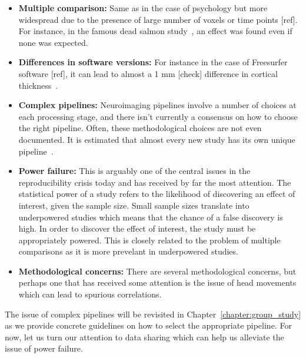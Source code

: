\begin{itemize}[noitemsep,partopsep=0pt]
\item \textbf{Multiple comparison:} Same as in the case of psychology but more widespread due to the presence of large number of voxels or time points [ref]. For instance, in the famous dead salmon study~\citep{bennett2009neural}, an effect was found even if none was expected.
\item \textbf{Differences in software versions:} For instance in the case of Freesurfer software [ref], it can lead to almost a 1 mm [check] difference in cortical thickness~\citep{gronenschild2012effects}.
\item \textbf{Complex pipelines:} Neuroimaging pipelines involve a number of choices at each processing stage, and there isn't currently a consensus on how to choose the right pipeline. Often, these methodological choices are not even documented. It is estimated that almost every new study has its own unique pipeline~\citep{Carp2012289}.
\item \textbf{Power failure:} This is arguably one of the central issues in the reproducibility crisis today and has received by far the most attention. The statistical power of a study refers to the likelihood of discovering an effect of interest, given the sample size. Small sample sizes translate into underpowered studies which means that the chance of a false discovery is high. In order to discover the effect of interest, the study must be appropriately powered. This is closely related to the problem of multiple comparisons as it is more prevelant in underpowered studies.
\item \textbf{Methodological concerns:} There are several methodological concerns, but perhaps one that has received some attention is the issue of head movements~\citep{yendiki2014spurious} which can lead to spurious correlations.
\end{itemize}

The issue of complex pipelines will be revisited in Chapter~\ref{chapter:group_study} as we provide concrete guidelines on how to select the appropriate pipeline. For now, let us turn our attention to data sharing which can help us alleviate the issue of power failure.


